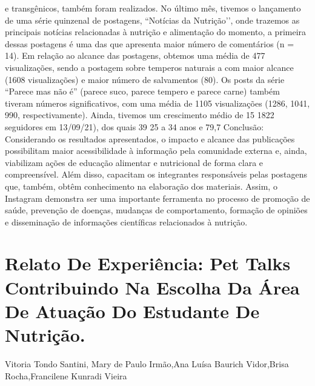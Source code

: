 e transgênicos, também foram realizados. No último mês, tivemos o lançamento de uma série
quinzenal de postagens, “Notícias da Nutrição’’, onde trazemos as principais notícias
relacionadas à nutrição e alimentação do momento, a primeira dessas postagens é uma das que
apresenta maior número de comentários (n = 14). Em relação ao alcance das postagens, obtemos
uma média de 477 visualizações, sendo a postagem sobre temperos naturais a com maior alcance
(1608 visualizações) e maior número de salvamentos (80). Os posts da série “Parece mas não é”
(parece suco, parece tempero e parece carne) também tiveram números significativos, com uma
média de 1105 visualizações (1286, 1041, 990, respectivamente). Ainda, tivemos um
crescimento médio de 15%
1822 seguidores em 13/09/21), dos quais 39%
25 a 34 anos e 79,7%
Conclusão: Considerando os resultados apresentados, o impacto e alcance das publicações
possibilitam maior acessibilidade à informação pela comunidade externa e, ainda, viabilizam
ações de educação alimentar e nutricional de forma clara e compreensível. Além disso,
capacitam os integrantes responsáveis pelas postagens que, também, obtêm conhecimento na
elaboração dos materiais. Assim, o Instagram demonstra ser uma importante ferramenta no
processo de promoção de saúde, prevenção de doenças, mudanças de comportamento, formação
de opiniões e disseminação de informações científicas relacionados à nutrição.




\section*{Relato De Experiência: Pet Talks Contribuindo Na Escolha Da Área De Atuação Do Estudante De Nutrição.}

Vitoria Tondo Santini, Mary de Paulo Irmão,Ana Luísa Baurich Vidor,Brisa Rocha,Francilene Kunradi Vieira

